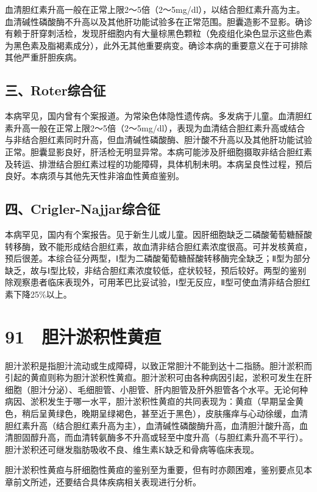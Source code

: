 血清胆红素升高一般在正常上限2～5倍（2～5mg/dl），以结合胆红素升高为主。血清碱性磷酸酶不升高以及其他肝功能试验多在正常范围。胆囊造影不显影。确诊有赖于肝穿刺活检，发现肝细胞内有大量棕黑色颗粒（免疫组化染色显示这些色素为黑色素及脂褐素成分），此外无其他重要病变。确诊本病的重要意义在于可排除其他严重肝胆疾病。

\subsection{三、Roter综合征}

本病罕见，国内曾有个案报道。为常染色体隐性遗传病。多发病于儿童。血清胆红素升高一般在正常上限2～5倍（2～5mg/dl），表现为血清结合胆红素升高或结合与非结合胆红素同时升高，但血清碱性磷酸酶、胆汁酸不升高以及其他肝功能试验正常。胆囊显影良好，肝活检无明显异常。本病可能涉及肝细胞摄取非结合胆红素及转运、排泄结合胆红素过程的功能障碍，具体机制未明。本病呈良性过程，预后良好。本病须与其他先天性非溶血性黄疸鉴别。

\subsection{四、Crigler-Najjar综合征}

本病罕见，国内有个案报告。见于新生儿或儿童。因肝细胞缺乏二磷酸葡萄糖醛酸转移酶，致不能形成结合胆红素，故血清非结合胆红素浓度很高。可并发核黄疸，预后很差。本综合征分两型，Ⅰ型为二磷酸葡萄糖醛酸转移酶完全缺乏；Ⅱ型为部分缺乏，故与Ⅰ型比较，非结合胆红素浓度较低，症状较轻，预后较好。两型的鉴别除观察患者临床表现外，可用苯巴比妥试验，Ⅰ型无反应，Ⅱ型可使血清非结合胆红素下降25\%以上。

\protect\hypertarget{text00216.html}{}{}

\section{91　胆汁淤积性黄疸}

胆汁淤积是指胆汁流动或生成障碍，以致正常胆汁不能到达十二指肠。胆汁淤积而引起的黄疸则称为胆汁淤积性黄疸。胆汁淤积可由各种病因引起，淤积可发生在肝细胞（胆汁分泌）、毛细胆管、小胆管、肝内胆管及肝外胆管各个水平。无论何种病因、淤积发生于哪一水平，胆汁淤积性黄疸的共同表现为：黄疸（早期呈金黄色，稍后呈黄绿色，晚期呈绿褐色，甚至近于黑色），皮肤瘙痒与心动徐缓，血清胆红素升高（结合胆红素升高为主），血清碱性磷酸酶升高，血清胆汁酸升高，血清胆固醇升高，而血清转氨酶多不升高或轻至中度升高（与胆红素升高不平行）。胆汁淤积还可继发脂肪吸收不良、维生素K缺乏和骨病等临床表现。

胆汁淤积性黄疸与肝细胞性黄疸的鉴别至为重要，但有时亦颇困难，鉴别要点见本章前文所述，还要结合具体疾病相关表现进行分析。

